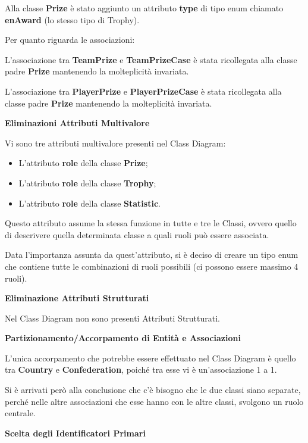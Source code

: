 Alla classe \textbf{Prize} è stato aggiunto un attributo 
\textbf{type} di tipo enum chiamato \textbf{enAward} (lo 
stesso tipo di Trophy).

Per quanto riguarda le associazioni:

L'associazione tra \textbf{TeamPrize} e 
\textbf{TeamPrizeCase} è stata ricollegata alla classe padre 
\textbf{Prize} mantenendo la molteplicità invariata.


L'associazione tra \textbf{PlayerPrize} e 
\textbf{PlayerPrizeCase} è stata ricollegata alla classe 
padre \textbf{Prize} mantenendo la molteplicità invariata.

\bigskip
\textbf{\large Eliminazioni Attributi Multivalore}
\bigskip

Vi sono tre attributi multivalore presenti nel Class Diagram:
\begin{itemize}
	\item L'attributo \textbf{role}
		della classe \textbf{Prize};
	\item L'attributo \textbf{role}
		della classe \textbf{Trophy};
	\item L'attributo \textbf{role}
		della classe \textbf{Statistic}.
\end{itemize}

Questo attributo assume la stessa funzione in tutte e tre le 
Classi, ovvero quello di descrivere quella determinata classe 
a quali ruoli può essere associata.


Data l'importanza assunta da quest'attributo, si è deciso di 
creare un tipo enum che contiene tutte le combinazioni di 
ruoli possibili (ci possono essere massimo 4 ruoli).

\newpage
\textbf{\large Eliminazione Attributi Strutturati}
\bigskip

Nel Class Diagram non sono presenti Attributi Strutturati.

\bigskip
\textbf{\large Partizionamento/Accorpamento di Entità
		e Associazioni}
\bigskip

L'unica accorpamento che potrebbe essere effettuato nel Class 
Diagram è quello tra \textbf{Country} e 
\textbf{Confederation}, poiché tra esse vi è un'associazione 
1 a 1.

Si è arrivati però alla conclusione che c'è bisogno che le 
due classi siano separate, perché nelle altre associazioni 
che esse hanno con le altre classi, svolgono un ruolo 
centrale.

\bigskip
\textbf{\large Scelta degli Identificatori Primari}
\bigskip

